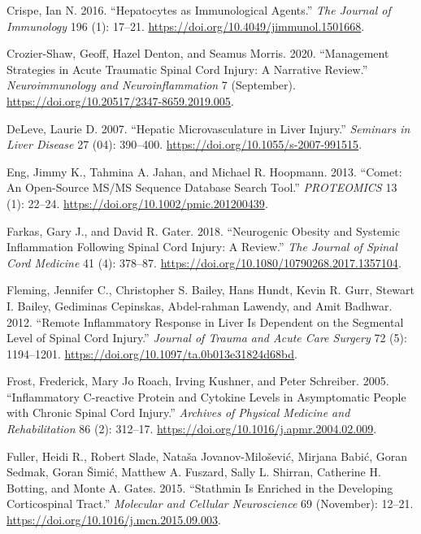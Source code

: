 \documentclass[9pt,lineno]{elife}
\newlength{\cslhangindent}
\newlength{\cslentryspacingunit} %
\newenvironment{CSLReferences}[2] %
 {%
  \setlength{\parindent}{0pt}
  \ifodd #1
  \let\oldpar\par
  \def\par{\hangindent=\cslhangindent\oldpar}
  \fi
  \setlength{\parskip}{#2\cslentryspacingunit}
 }%
 {}
\begin{document}
\begin{landscape}
\begin{landscape}
\begin{CSLReferences}{1}{0}
\leavevmode{}%
Crispe, Ian N. 2016. {``Hepatocytes as {Immunological Agents}.''} \emph{The Journal of Immunology} 196 (1): 17--21. \url{https://doi.org/10.4049/jimmunol.1501668}.

\leavevmode{}%
Crozier-Shaw, Geoff, Hazel Denton, and Seamus Morris. 2020. {``Management Strategies in Acute Traumatic Spinal Cord Injury: A Narrative Review.''} \emph{Neuroimmunology and Neuroinflammation} 7 (September). \url{https://doi.org/10.20517/2347-8659.2019.005}.

\leavevmode{}%
DeLeve, Laurie D. 2007. {``Hepatic {Microvasculature} in {Liver Injury}.''} \emph{Seminars in Liver Disease} 27 (04): 390--400. \url{https://doi.org/10.1055/s-2007-991515}.

\leavevmode{}%
Eng, Jimmy K., Tahmina A. Jahan, and Michael R. Hoopmann. 2013. {``Comet: {An} Open-Source {MS}/{MS} Sequence Database Search Tool.''} \emph{PROTEOMICS} 13 (1): 22--24. \url{https://doi.org/10.1002/pmic.201200439}.

\leavevmode{}%
Farkas, Gary J., and David R. Gater. 2018. {``Neurogenic Obesity and Systemic Inflammation Following Spinal Cord Injury: {A} Review.''} \emph{The Journal of Spinal Cord Medicine} 41 (4): 378--87. \url{https://doi.org/10.1080/10790268.2017.1357104}.

\leavevmode{}%
Fleming, Jennifer C., Christopher S. Bailey, Hans Hundt, Kevin R. Gurr, Stewart I. Bailey, Gediminas Cepinskas, Abdel-rahman Lawendy, and Amit Badhwar. 2012. {``Remote Inflammatory Response in Liver Is Dependent on the Segmental Level of Spinal Cord Injury.''} \emph{Journal of Trauma and Acute Care Surgery} 72 (5): 1194--1201. \url{https://doi.org/10.1097/ta.0b013e31824d68bd}.

\leavevmode{}%
Frost, Frederick, Mary Jo Roach, Irving Kushner, and Peter Schreiber. 2005. {``Inflammatory {C-reactive} Protein and Cytokine Levels in Asymptomatic People with Chronic Spinal Cord Injury.''} \emph{Archives of Physical Medicine and Rehabilitation} 86 (2): 312--17. \url{https://doi.org/10.1016/j.apmr.2004.02.009}.

\leavevmode{}%
Fuller, Heidi R., Robert Slade, Nataša Jovanov-Milošević, Mirjana Babić, Goran Sedmak, Goran Šimić, Matthew A. Fuszard, Sally L. Shirran, Catherine H. Botting, and Monte A. Gates. 2015. {``Stathmin Is Enriched in the Developing Corticospinal Tract.''} \emph{Molecular and Cellular Neuroscience} 69 (November): 12--21. \url{https://doi.org/10.1016/j.mcn.2015.09.003}.


\end{CSLReferences}
\end{landscape}
\end{landscape}
\end{document}
